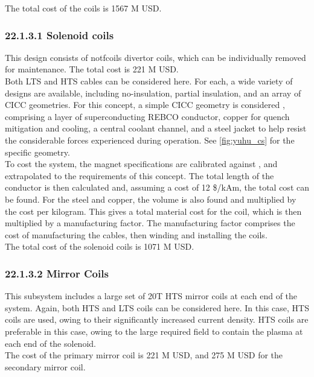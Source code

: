 The total cost of the coils is 1567 M USD.


\subsubsection*{22.1.3.1 Solenoid coils}

This design consists of notfcoils divertor coils, which can be individually removed for maintenance. The total cost is 221 M USD.\\

Both LTS and HTS cables can be considered here. For each, a wide variety of designs are available, including no-insulation, partial insulation, and an array of CICC geometries. For this concept, a simple CICC geometry is considered \cite{Menard2016}, comprising a layer of superconducting REBCO conductor, copper for quench mitigation and cooling, a central coolant channel, and a steel jacket to help resist the considerable forces experienced during operation. See \ref{fig:yuhu_cs} for the specific geometry.\\

To cost the system, the magnet specifications are calibrated against \cite{Menard2016}, and extrapolated to the requirements of this concept. The total length of the conductor is then calculated and, assuming a cost of 12 \$/kAm, the total cost can be found. For the steel and copper, the volume is also found and multiplied by the cost per kilogram. This gives a total material cost for the coil, which is then multiplied by a manufacturing factor. The manufacturing factor comprises the cost of manufacturing the cables, then winding and installing the coils. \\

The total cost of the solenoid coils is 1071 M USD.


\subsubsection*{22.1.3.2 Mirror Coils}

This subsystem includes a large set of 20T HTS mirror coils at each end of the system. Again, both HTS and LTS coils can be considered here. In this case, HTS coils are used, owing to their significantly increased current density. HTS coils are preferable in this case, owing to the large required field to contain the plasma at each end of the solenoid.  \\

The cost of the primary mirror coil is 221 M USD, and 275 M USD for the secondary mirror coil. \\


